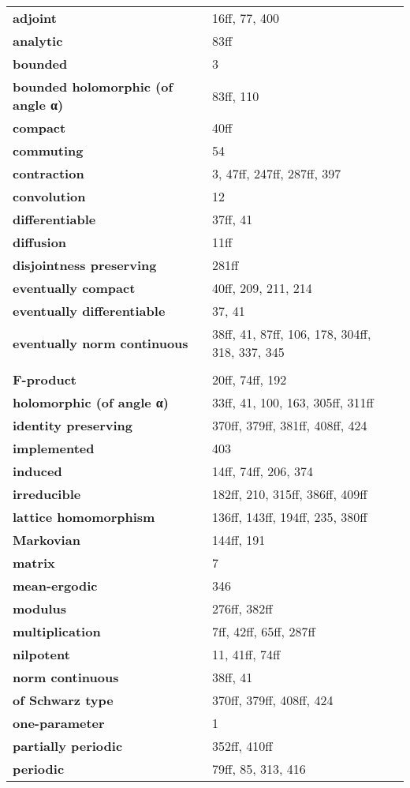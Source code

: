 \documentclass[10pt]{scrartcl}
\begin{document}
\begin{longtable}{>{\bfseries}p{6cm}p{8cm}}
\quad adjoint & 16ff, 77, 400 \\
\quad analytic & 83ff \\
\quad bounded & 3 \\
\quad bounded holomorphic (of angle α) & 83ff, 110 \\
\quad compact & 40ff \\
\quad commuting & 54 \\
\quad contraction & 3, 47ff, 247ff, 287ff, 397 \\
\quad convolution & 12 \\
\quad differentiable & 37ff, 41 \\
\quad diffusion & 11ff \\
\quad disjointness preserving & 281ff \\
\quad eventually compact & 40ff, 209, 211, 214 \\
\quad eventually differentiable & 37, 41 \\
\quad eventually norm continuous & 38ff, 41, 87ff, 106, 178, 304ff, 318, 337, 345 \\
\\
\textbf{F-product} & 20ff, 74ff, 192 \\
\quad holomorphic (of angle α) & 33ff, 41, 100, 163, 305ff, 311ff \\
\quad identity preserving & 370ff, 379ff, 381ff, 408ff, 424 \\
\quad implemented & 403 \\
\quad induced & 14ff, 74ff, 206, 374 \\
\quad irreducible & 182ff, 210, 315ff, 386ff, 409ff \\
\quad lattice homomorphism & 136ff, 143ff, 194ff, 235, 380ff \\
\quad Markovian & 144ff, 191 \\
\quad matrix & 7 \\
\quad mean-ergodic & 346 \\
\quad modulus & 276ff, 382ff \\
\quad multiplication & 7ff, 42ff, 65ff, 287ff \\
\quad nilpotent & 11, 41ff, 74ff \\
\quad norm continuous & 38ff, 41 \\
\quad of Schwarz type & 370ff, 379ff, 408ff, 424 \\
\quad one-parameter & 1 \\
\quad partially periodic & 352ff, 410ff \\
\quad periodic & 79ff, 85, 313, 416 \\

\end{longtable}
\end{document}
